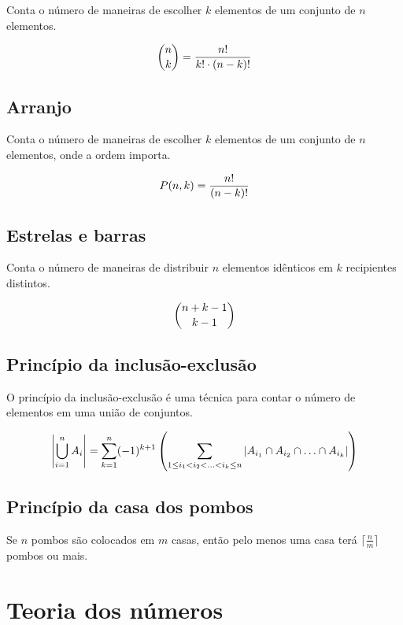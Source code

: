 \documentclass[10pt, a4paper, oneside]{book}
\begin{document}
Conta o número de maneiras de escolher $k$ elementos de um conjunto de $n$ elementos.

\begin{equation*}
\large
\binom{n}{k} = \frac{n!}{k! \cdot (n-k)!}
\end{equation*}

\subsection{Arranjo}

Conta o número de maneiras de escolher $k$ elementos de um conjunto de $n$ elementos, onde a ordem importa.

\begin{equation*}
\large
P(n, k) = \frac{n!}{(n-k)!}
\end{equation*}

\subsection{Estrelas e barras}

Conta o número de maneiras de distribuir $n$ elementos idênticos em $k$ recipientes distintos.

\begin{equation*}
\large
\binom{n+k-1}{k-1}
\end{equation*}

\subsection{Princípio da inclusão-exclusão}

O princípio da inclusão-exclusão é uma técnica para contar o número de elementos em uma união de conjuntos.

\begin{equation*}
\large
\left| \bigcup_{i=1}^{n} A_i \right| = \sum_{k=1}^{n} (-1)^{k+1} \left( \sum_{1 \leq i_1 < i_2 < \ldots < i_k \leq n} \left| A_{i_1} \cap A_{i_2} \cap \ldots \cap A_{i_k} \right| \right)
\end{equation*}

\subsection{Princípio da casa dos pombos}

Se $n$ pombos são colocados em $m$ casas, então pelo menos uma casa terá $\lceil \frac{n}{m} \rceil$ pombos ou mais.

\section{Teoria dos números}
\end{document}
